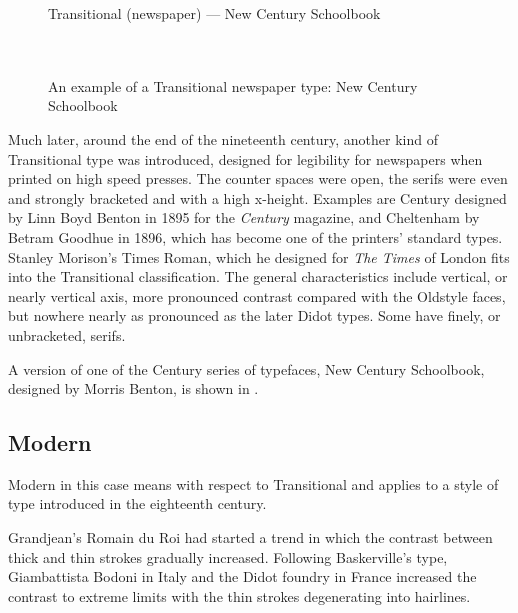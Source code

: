\documentclass[10pt,a4paper,extrafontsizes]{memoir}
\begin{document}
\begin{figure}
\centering
{\centering{}\selectfont
  Transitional (newspaper) --- New Century Schoolbook \\
  \UCalphabet \\
  \LCalphabet \\
  \fox\par}
\caption{An example of a Transitional newspaper type: New Century Schoolbook} 
   \label{fig:newcent}
\end{figure}

\begin{paracol}{2}
\switchEng
    Much later, around the end of the nineteenth century, another kind of 
Transitional type was introduced, designed for legibility for newspapers 
when printed on high speed presses. The counter spaces were open, the 
serifs were even and strongly bracketed and with a high x-height.
Examples are Century designed by 
 Linn Boyd Benton in 1895 for the \emph{Century}
magazine, and 
Cheltenham by Betram Goodhue 
in 1896, which has become one of the printers' standard types. Stanley
Morison's Times Roman, 
which he
designed for \emph{The Times} of London fits into the Transitional
classification. The general characteristics include vertical, or nearly
vertical axis, more pronounced contrast compared with the Oldstyle faces, but
nowhere nearly as pronounced as the later Didot types. Some have finely, or
unbracketed, serifs.

    A version of one of the Century 
series of typefaces, 
New Century Schoolbook, designed
by Morris Benton,
is shown in .
\end{paracol}

\subsection{Modern}


\begin{paracol}{2}
\switchEng
    Modern in this case means with respect to Transitional 
and applies to a style of type introduced in the eighteenth century.

    Grandjean's Romain du Roi had started a trend 
in which the contrast 
between thick and thin strokes gradually increased. Following Baskerville's
type, Giambattista Bodoni in Italy and the 
Didot foundry in France increased the contrast 
to extreme limits with the thin strokes degenerating into hairlines.
\end{paracol}
\end{document}
